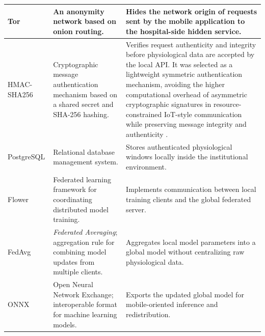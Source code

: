 \documentclass[12pt]{article}
\begin{document}
\begin{longtable}{p{2.5cm} p{4.7cm} p{6.4cm}}
Tor & An anonymity network based on onion routing. & Hides the network origin of requests sent by the mobile application to the hospital-side hidden service. \\ \midrule

HMAC-SHA256 & Cryptographic message authentication mechanism based on a shared secret and SHA-256 hashing. & Verifies request authenticity and integrity before physiological data are accepted by the local API. It was selected as a lightweight symmetric authentication mechanism, avoiding the higher computational overhead of asymmetric cryptographic signatures in resource-constrained IoT-style communication while preserving message integrity and authenticity \cite{okpu2026iothealthcare}. \\ \midrule

PostgreSQL & Relational database management system. & Stores authenticated physiological windows locally inside the institutional environment. \\ \midrule

Flower & Federated learning framework for coordinating distributed model training. & Implements communication between local training clients and the global federated server. \\ \midrule

FedAvg & \textit{Federated Averaging}; aggregation rule for combining model updates from multiple clients. & Aggregates local model parameters into a global model without centralizing raw physiological data. \\ \midrule

ONNX & Open Neural Network Exchange; interoperable format for machine learning models. & Exports the updated global model for mobile-oriented inference and redistribution. \\

\end{longtable}

\endgroup
\end{document}
